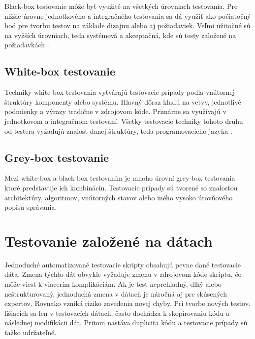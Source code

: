 Black-box testovanie môže byť využité na všetkých úrovniach testovania. Pre nižšie úrovne jednotkového a integračného testovania sa dá využiť ako počiatočný bod pre tvorbu testov na základe dizajnu alebo aj požiadaviek. Veľmi užitočné sú na vyžších úrovniach, teda systémová a akceptačná, kde sú testy založené na požiadavkách  \cite{Gst}.

\subsection*{White-box testovanie}
Techniky white-box testovania vytvárajú testovacie prípady podľa vnútornej štruktúry komponenty alebo systému. Hlavný dôraz kladú na vetvy, jednotlivé podmienky a výrazy tradične v zdrojovom kóde. Primárne sa využívajú v jednotkovom a integračnom testovaní. Všetky testovacie techniky tohoto druhu od testera vyžadujú znalosť danej štruktúry, teda programovacieho jazyka \cite{Gst}.    
\subsection*{Grey-box testovanie}
Mezi white-box a black-box testovaním je mnoho úrovní grey-box testovania ktoré predstavuje ich kombináciu. Testovacie prípady sú tvorené so znalosťou architektúry, algoritmov, vnútorných stavov alebo iného vysoko úrovňového popisu správania.
\section{Testovanie založené na dátach}
Jednoduché automatizované testovacie skripty obsahujú pevne dané testovacie dáta. Zmena týchto dát obvykle vyžaduje zmenu v zdrojovom kóde skriptu, čo môže viesť k viacerím komplikáciám. Ak je test neprehľadný, dlhý alebo neštrukturovaný, jednoduchá zmena v dátach je náročná aj pre skúsených expertov. Rovnako vzniká riziko zavedenia novej chyby. Pri tvorbe nových testov, líšiacich sa len v testovacích dátach, často dochádza k skopírovaniu kódu a následnej modifikácii dát. Pritom nastáva duplicita kódu a testovacie prípady sú ťažko udržateľné. 

